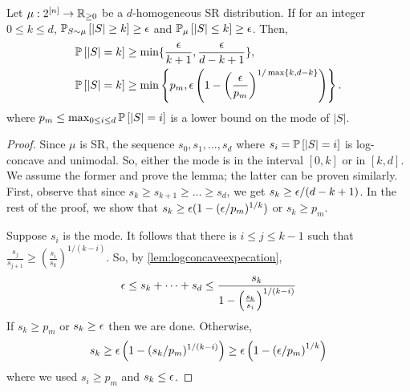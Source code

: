 \begin{lemma}\label{lem:logconcavity}
Let $\mu:2^{[n]}\to\R_{\geq 0}$ be a $d$-homogeneous SR distribution. If for an integer $0\leq k\leq d$, $\PP{S\sim\mu}{|S|\geq k}\geq \eps$ and $\PP{\mu}{|S|\leq k}\geq \eps$. Then, 
\begin{align*}\P{|S|=k}&\geq \min\{\frac{\eps}{k+1},\frac{\eps}{d-k+1}\},\\
\P{|S|=k}&\geq \min\left\{p_m, \eps\left(1-\left(\frac{\eps}{p_m}\right)^{1/\max\{k,d-k\}}\right)\right\}.
\end{align*}
where $p_m \leq \max_{0\leq i\leq d}\P{|S|=i}$ is a lower bound on the mode of $|S|$.
\end{lemma}
\begin{proof}
Since $\mu$ is SR, the sequence $s_0, s_1,\dots,s_d$ where $s_i=\P{|S|=i}$ is log-concave and unimodal. So, either the mode is in the interval $[0,k]$ or in $[k,d]$. We assume the former and prove the lemma; the latter can be proven similarly.
First, observe that since $s_k\geq s_{k+1}\geq \dots\geq s_d$, we get $s_k\geq \eps/(d-k+1)$. In the rest of the proof, we show that $s_k\geq \eps(1-(\eps/p_m)^{1/k})$ or $s_k \ge p_m$.

Suppose $s_i$ is the mode. %
It follows that there is $i\leq j\leq k-1$ such that $\frac{s_j}{s_{j+1}}\geq \left(\frac{s_i}{s_k}\right)^{1/(k-i)}$.  So, by \cref{lem:logconcaveexpecation}, 
$$\eps\leq  s_k+\dots+s_d\leq \frac{s_k}{1-\left(\frac{s_k}{s_i}\right)^{1/(k-i)}}$$ 
If $s_k\geq p_m$ or $s_k\geq \eps$ then we are done. Otherwise, 
$$ s_k\geq \eps \left(1-(s_k/p_m)^{1/(k-i)}\right)\geq \eps\left(1- \left(\eps/p_m\right)^{1/k}\right)$$
where we used $s_i\geq p_m$ and $s_k\leq \eps$.
\end{proof}


